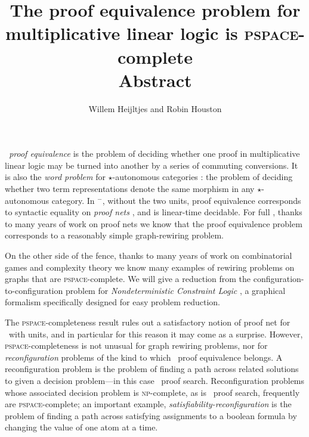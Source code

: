\documentclass{robinminion}
\author{Willem Heijltjes and Robin Houston}
\title{The proof equivalence problem for multiplicative linear logic is \textsc{pspace}-complete\\[4pt]\large Abstract}
\begin{document}
\maketitle

\linespread{1.1}\selectfont
\noindent\emph{\MLL\ proof equivalence} is the problem of deciding whether one proof in multiplicative linear logic may be turned into another by a series of commuting conversions. It is also the \emph{word problem} for $\star$-autonomous categories \citep{Barr-1991}: the problem of deciding whether two term representations denote the same morphism in any $\star$-autonomous category. In \MLL$^{-}$, without the two units, proof equivalence corresponds to syntactic equality on \emph{proof nets} \citep{Girard87, DR89}, and is linear-time decidable. For full \MLL, thanks to many years of work on proof nets \citep{TrimbleThesis, BCST, HughesFreeStar} we know that the proof equivalence problem corresponds to a reasonably simple graph-rewiring problem.

On the other side of the fence, thanks to many years of work on combinatorial games and complexity theory \citep{RushHour, HearnDemaineTCS, GamesPuzzlesAndComputation, TheConnectivityOfBooleanSatisfiability, ReconfigurationProblems} we know many examples of rewiring problems on graphs that are \textsc{pspace}-complete. We will give a reduction from the configuration-to-configuration problem for \emph{Nondeterministic Constraint Logic} \citep{HearnDemaineTCS, GamesPuzzlesAndComputation}, a graphical formalism specifically designed for easy problem reduction.

The \textsc{pspace}-completeness result rules out a satisfactory notion of proof net for \MLL\ with units, and in particular for this reason it may come as a surprise. However, \textsc{pspace}-completeness is not unusual for graph rewiring problems,  nor for \emph{reconfiguration} problems \citep{ReconfigurationProblems} of the kind to which \MLL\ proof equivalence belongs. A reconfiguration problem is the problem of finding a path across related solutions to given a decision problem---in this case \MLL\ proof search. Reconfiguration problems whose associated decision problem is \textsc{np}-complete, as is \MLL\ proof search, frequently are \textsc{pspace}-complete; an important example, \emph{satisfiability-reconfiguration} \citep{TheConnectivityOfBooleanSatisfiability} is the problem of finding a path across satisfying assignments to a boolean formula by changing the value of one atom at a time.

\small


\end{document}
